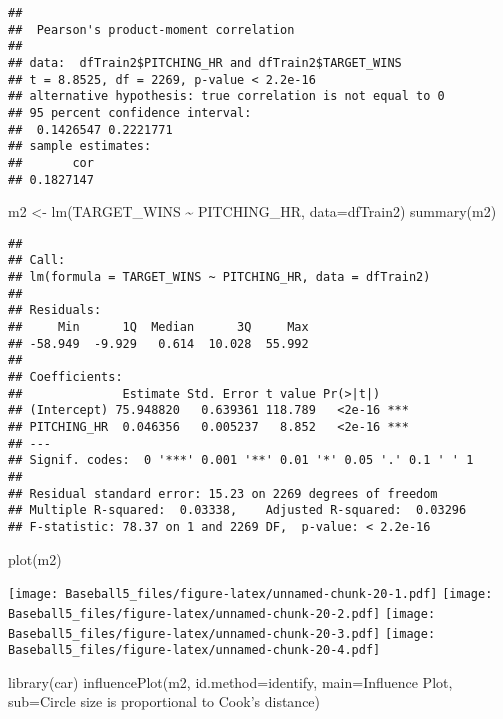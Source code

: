 \documentclass[
]{article}
\newenvironment{Shaded}{\begin{snugshade}}{\end{snugshade}}
\newcommand{\AttributeTok}[1]{\textcolor[rgb]{0.77,0.63,0.00}{#1}}
\newcommand{\FunctionTok}[1]{\textcolor[rgb]{0.00,0.00,0.00}{#1}}
\newcommand{\NormalTok}[1]{#1}
\newcommand{\OtherTok}[1]{\textcolor[rgb]{0.56,0.35,0.01}{#1}}
\newcommand{\SpecialCharTok}[1]{\textcolor[rgb]{0.00,0.00,0.00}{#1}}
\newcommand{\StringTok}[1]{\textcolor[rgb]{0.31,0.60,0.02}{#1}}
\begin{document}
\begin{verbatim}
## 
##  Pearson's product-moment correlation
## 
## data:  dfTrain2$PITCHING_HR and dfTrain2$TARGET_WINS
## t = 8.8525, df = 2269, p-value < 2.2e-16
## alternative hypothesis: true correlation is not equal to 0
## 95 percent confidence interval:
##  0.1426547 0.2221771
## sample estimates:
##       cor 
## 0.1827147
\end{verbatim}

\begin{Shaded}
\begin{Highlighting}[]
\NormalTok{m2 }\OtherTok{\textless{}{-}} \FunctionTok{lm}\NormalTok{(TARGET\_WINS }\SpecialCharTok{\textasciitilde{}}\NormalTok{ PITCHING\_HR, }\AttributeTok{data=}\NormalTok{dfTrain2)}
\FunctionTok{summary}\NormalTok{(m2)}
\end{Highlighting}
\end{Shaded}

\begin{verbatim}
## 
## Call:
## lm(formula = TARGET_WINS ~ PITCHING_HR, data = dfTrain2)
## 
## Residuals:
##     Min      1Q  Median      3Q     Max 
## -58.949  -9.929   0.614  10.028  55.992 
## 
## Coefficients:
##              Estimate Std. Error t value Pr(>|t|)    
## (Intercept) 75.948820   0.639361 118.789   <2e-16 ***
## PITCHING_HR  0.046356   0.005237   8.852   <2e-16 ***
## ---
## Signif. codes:  0 '***' 0.001 '**' 0.01 '*' 0.05 '.' 0.1 ' ' 1
## 
## Residual standard error: 15.23 on 2269 degrees of freedom
## Multiple R-squared:  0.03338,    Adjusted R-squared:  0.03296 
## F-statistic: 78.37 on 1 and 2269 DF,  p-value: < 2.2e-16
\end{verbatim}

\begin{Shaded}
\begin{Highlighting}[]
\FunctionTok{plot}\NormalTok{(m2)}
\end{Highlighting}
\end{Shaded}

\texttt{[image: Baseball5\_files/figure-latex/unnamed-chunk-20-1.pdf]}
\texttt{[image: Baseball5\_files/figure-latex/unnamed-chunk-20-2.pdf]}
\texttt{[image: Baseball5\_files/figure-latex/unnamed-chunk-20-3.pdf]}
\texttt{[image: Baseball5\_files/figure-latex/unnamed-chunk-20-4.pdf]}

\begin{Shaded}
\begin{Highlighting}[]
\FunctionTok{library}\NormalTok{(car) }
\FunctionTok{influencePlot}\NormalTok{(m2, }\AttributeTok{id.method=}\StringTok{\textquotesingle{}identify\textquotesingle{}}\NormalTok{, }\AttributeTok{main=}\StringTok{\textquotesingle{}Influence Plot\textquotesingle{}}\NormalTok{, }\AttributeTok{sub=}\StringTok{\textquotesingle{}Circle size is proportional to Cook’s distance\textquotesingle{}}\NormalTok{)}
\end{Highlighting}
\end{Shaded}
\end{document}
